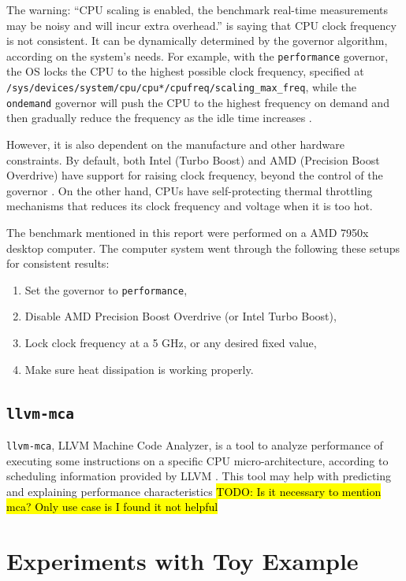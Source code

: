 \documentclass[logo,bsc,singlespacing,parskip]{infthesis}
\newenvironment{compactlist}
{ \begin{enumerate}
    \setlength{\itemsep}{0pt}
    \setlength{\parskip}{0pt}
    \setlength{\parsep}{0pt}     
}
{ \end{enumerate} }
\begin{document}
The warning: ``CPU scaling is enabled, the benchmark real-time measurements may
be noisy and will incur extra overhead.'' is saying that CPU clock frequency is
not consistent. It can be dynamically determined by the governor algorithm,
according on the system's needs. For example, with the \texttt{performance}
governor, the OS locks the CPU to the highest possible clock frequency,
specified at \texttt{/sys/devices/system/cpu/cpu*/cpufreq/scaling\_max\_freq},
while the \texttt{ondemand} governor will push the CPU to the highest frequency
on demand and then gradually reduce the frequency as the idle time increases
\cite{archLinuxFreqScal}.

However, it is also dependent on the manufacture and other hardware constraints.
By default, both Intel (Turbo Boost) and AMD (Precision Boost Overdrive) have
support for raising clock frequency, beyond the control of the governor
\cite{GoogleBenchReduceVariance}. On the other hand, CPUs have self-protecting
thermal throttling mechanisms that reduces its clock frequency and voltage when
it is too hot. 

The benchmark mentioned in this report were performed on a AMD 7950x desktop
computer. The computer system went through the following these setups for
consistent results:
\begin{compactlist}
    \item Set the governor to \texttt{performance}, 
    \item Disable AMD Precision Boost Overdrive (or Intel Turbo Boost), 
    \item Lock clock frequency at a 5 GHz, or any desired fixed value,
    \item Make sure heat dissipation is working properly.
\end{compactlist}



\section{\texttt{llvm-mca}}

\texttt{llvm-mca}, LLVM Machine Code Analyzer, is a tool to analyze performance of
executing some instructions on a specific CPU micro-architecture, according to
scheduling information provided by LLVM \cite{llvm-mca}. This tool may help with predicting and
explaining performance characteristics \hl{TODO: Is it necessary to mention mca?
Only use case is I found it not helpful}


\chapter{Experiments with Toy Example}
\label{sec:Toy}
\end{document}
